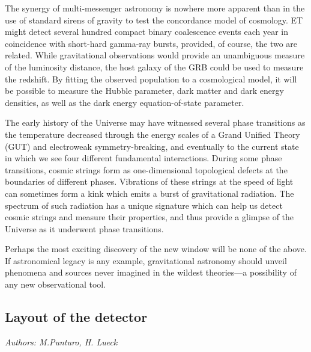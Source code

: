 The synergy of multi-messenger astronomy is nowhere more
apparent than in the use of standard sirens of gravity to
test the concordance model of cosmology.  ET might detect
several hundred compact binary coalescence events each year
in coincidence with short-hard gamma-ray bursts, provided, of
course, the two are related.  While gravitational observations would
provide an unambiguous measure of the luminosity distance,
the host galaxy of the GRB could be used to measure the
redshift. By fitting the observed population to a cosmological
model, it will be possible to measure the Hubble parameter,
dark matter and dark energy densities, as well as the
dark energy equation-of-state parameter.

The early history of the Universe may have witnessed
several phase transitions as the temperature decreased
through the energy scales of a Grand Unified Theory (GUT)
and electroweak symmetry-breaking, and eventually to the
current state in which we see four different fundamental
interactions. During some phase transitions, cosmic strings
form as one-dimensional topological defects at the
boundaries of different phases. Vibrations of these strings
at the speed of light can sometimes form a kink which emits a
burst of gravitational radiation. The spectrum of such radiation
has a unique signature which can help us detect cosmic strings
and measure their properties, and thus provide a glimpse of the
Universe as it underwent phase transitions.

Perhaps the most exciting discovery of the new window will
be none of the above. If astronomical legacy is any example,
gravitational astronomy should unveil phenomena and
sources never imagined in the wildest theories---a possibility
of any new observational tool.


\FloatBarrier
\newpage
\subsection{Layout of the detector}
\emph{Authors: M.Punturo, H. Lueck} 

